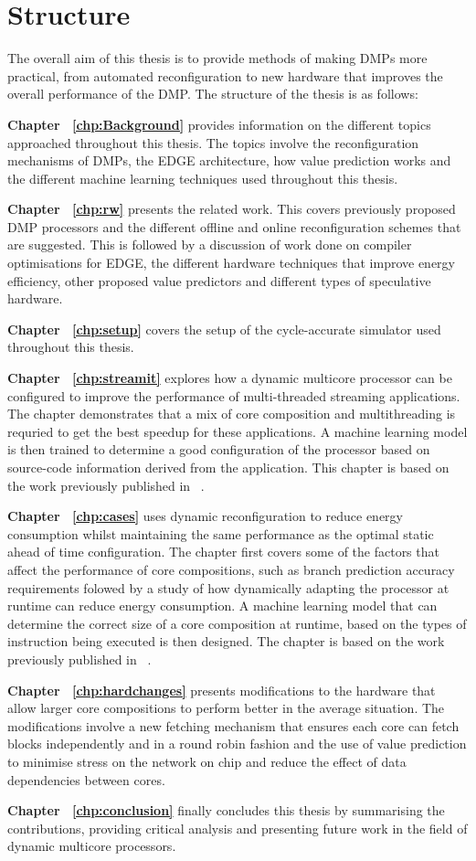 \section{Structure}
The overall aim of this thesis is to provide methods of making DMPs more practical, from automated reconfiguration to new hardware that improves the overall performance of the DMP.
The structure of the thesis is as follows:

\textbf{Chapter ~\ref{chp:Background}} provides information on the different topics approached throughout this thesis. The topics involve the reconfiguration mechanisms of DMPs, the EDGE architecture, how value prediction works and the different machine learning techniques used throughout this thesis.

\textbf{Chapter ~\ref{chp:rw}} presents the related work. This covers previously proposed DMP processors and the different offline and online reconfiguration schemes that are suggested. 
This is followed by a discussion of work done on compiler optimisations for EDGE, the different hardware techniques that improve energy efficiency, other proposed value predictors and different types of speculative hardware.

\textbf{Chapter ~\ref{chp:setup}} covers the setup of the cycle-accurate simulator used throughout this thesis.

\textbf{Chapter ~\ref{chp:streamit}} explores how a dynamic multicore processor can be configured to improve the performance of multi-threaded streaming applications.
The chapter demonstrates that a mix of core composition and multithreading is requried to get the best speedup for these applications.
A machine learning model is then trained to determine a good configuration of the processor based on source-code information derived from the application.
This chapter is based on the work previously published in ~\cite{micolet2016dmpstream}.

\textbf{Chapter ~\ref{chp:cases}} uses dynamic reconfiguration to reduce energy consumption whilst maintaining the same performance as the optimal static ahead of time configuration.
The chapter first covers some of the factors that affect the performance of core compositions, such as branch prediction accuracy requirements folowed by a study of how dynamically adapting the processor at runtime can reduce energy consumption.
A machine learning model that can determine the correct size of a core composition at runtime, based on the types of instruction being executed is then designed.
The chapter is based on the work previously published in ~\cite{micolet2017cases}.

\textbf{Chapter ~\ref{chp:hardchanges}} presents modifications to the hardware that allow larger core compositions to perform better in the average situation.
The modifications involve a new fetching mechanism that ensures each core can fetch blocks independently and in a round robin fashion and the use of value prediction to minimise stress on the network on chip and reduce the effect of data dependencies between cores.

\textbf{Chapter ~\ref{chp:conclusion}} finally concludes this thesis by summarising the contributions, providing critical analysis and presenting future work in the field of dynamic multicore processors.